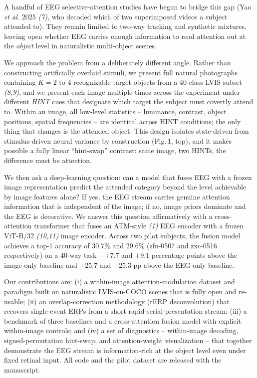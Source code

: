 \documentclass[12pt]{article}
\begin{document}
A handful of EEG selective-attention studies have begun to bridge
this gap (Yao \textit{et al.} 2025 \textit{(7)}, who decoded which of
two superimposed videos a subject attended to). They remain limited
to two-way tracking and synthetic mixtures, leaving open whether
EEG carries enough information to read attention out at the
\textit{object} level in naturalistic multi-object scenes.

We approach the problem from a deliberately different angle.  Rather
than constructing artificially overlaid stimuli, we present full
natural photographs containing $K=2$ to $4$ recognizable target
objects from a 40-class LVIS subset \textit{(8,9)}, and we present
each image multiple times across the experiment under different
\textit{HINT} cues that designate which target the subject must
covertly attend to.  Within an image, all low-level statistics --
luminance, contrast, object positions, spatial frequencies -- are
identical across HINT conditions; the only thing that changes is the
attended object.  This design isolates state-driven from
stimulus-driven neural variance by construction (Fig.\,1, top), and
it makes possible a fully linear ``hint-swap'' contrast: same image,
two HINTs, the difference must be attention.

We then ask a deep-learning question: can a model that fuses EEG with
a frozen image representation predict the attended category beyond
the level achievable by image features alone?  If yes, the EEG
stream carries genuine attention information that is independent of
the image; if no, image priors dominate and the EEG is decorative.
We answer this question affirmatively with a cross-attention
transformer that fuses an ATM-style \textit{(1)} EEG encoder with a
frozen ViT-B/32 \textit{(10,11)} image encoder.  Across two pilot
subjects, the fusion model achieves a top-1 accuracy of
$30.7\%$ and $29.6\%$ (zfn-0507 and zxc-0516 respectively) on a
40-way task -- $+7.7$ and $+9.1$ percentage points above the
image-only baseline and $+25.7$ and $+25.3$ pp above the EEG-only
baseline.

Our contributions are: (i) a within-image attention-modulation
dataset and paradigm built on naturalistic LVIS-on-COCO scenes that
is fully open and re-usable; (ii) an overlap-correction methodology
(rERP deconvolution) that recovers single-event ERPs from a short
rapid-serial-presentation stream; (iii) a benchmark of three
baselines and a cross-attention fusion model with explicit
within-image controls; and (iv) a set of diagnostics --
within-image decoding, signed-permutation hint-swap, and
attention-weight visualization -- that together demonstrate the EEG
stream is information-rich at the object level even under fixed
retinal input.  All code and the pilot dataset are released with
the manuscript.
\end{document}
